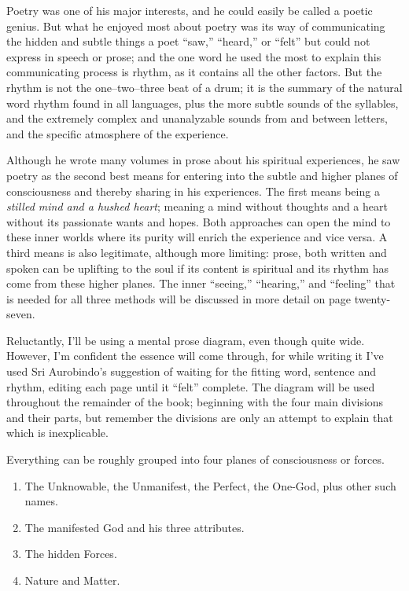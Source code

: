 \documentclass[12pt,a4paper]{book}
\begin{document}
Poetry was one of his major interests, and he could easily be called a
poetic genius. But what he enjoyed most about poetry was its way of
communicating the hidden and subtle things a poet ``saw,'' ``heard,''
or ``felt'' but could not express in speech or prose; and the one word
he used the most to explain this communicating process is rhythm, as
it contains all the other factors. But the rhythm is not the
one--two--three beat of a drum; it is the summary of the natural word
rhythm found in all languages, plus the more subtle sounds of the
syllables, and the extremely complex and unanalyzable sounds from and
between letters, and the specific atmosphere of the experience.

Although he wrote many volumes in prose about his spiritual
experiences, he saw poetry as the second best means for entering into
the subtle and higher planes of consciousness and thereby sharing in
his experiences. The first means being a \emph{stilled mind and a
  hushed heart}; meaning a mind without thoughts and a heart without
its passionate wants and hopes. Both approaches can open the mind to
these inner worlds where its purity will enrich the experience and
vice versa. A third means is also legitimate, although more limiting:
prose, both written and spoken can be uplifting to the soul if its
content is spiritual and its rhythm has come from these higher planes.
The inner ``seeing,'' ``hearing,'' and ``feeling'' that is needed for
all three methods will be discussed in more detail on page
twenty-seven.

Reluctantly, I'll be using a mental prose diagram, even though quite
wide. However, I'm confident the essence will come through, for while
writing it I've used Sri Aurobindo's suggestion of waiting for the
fitting word, sentence and rhythm, editing each page until it ``felt''
complete.  The diagram will be used throughout the remainder of the
book; beginning with the four main divisions and their parts, but
remember the divisions are only an attempt to explain that which is
inexplicable.

Everything can be roughly grouped into four planes of consciousness or forces.


\begin{enumerate}
\item The Unknowable, the Unmanifest, the Perfect, the One-God, plus other such names.

\item The manifested God and his three attributes.

\item The hidden Forces.

\item Nature and Matter.
\end{enumerate}
\end{document}
